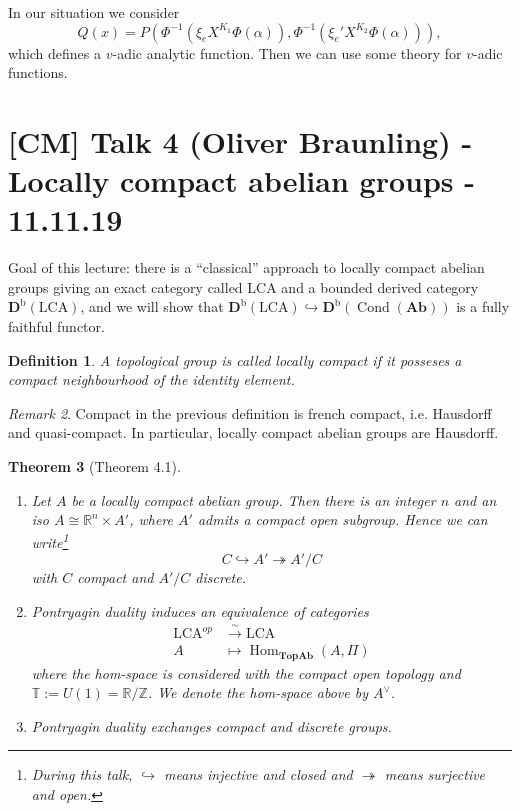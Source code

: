 \documentclass[12pt]{article}
\theoremstyle{darkgreentheorem}
\newtheorem{thm}{Theorem}[section]
\theoremstyle{darkbluedefinition}
\newtheorem{defn}[thm]{Definition}
\theoremstyle{darkredexample}
\theoremstyle{remark}
\newtheorem{rem}[thm]{Remark}
\newcommand{\Z}{\mathbb{Z}}
\newcommand{\R}{\mathbb{R}}
\newcommand{\1}{\mathbbm{1}}
\newcommand{\bbT}{\mathbb{T}}
\newcommand{\Top}{\mathbf{Top}}
\newcommand{\Ab}{\mathbf{Ab}}
\newcommand{\Db}{\mathbf{D}^{\mathrm{b}}}
\DeclareMathOperator{\Hom}{Hom}
\DeclareMathOperator{\Cond}{Cond}
\newcommand{\dual}{^{\vee}}
\newcommand{\tms}{\times}
\newcommand{\epi}{\twoheadrightarrow}
\newcommand{\mono}{\hookrightarrow}
\newcommand{\LCA}{\mathrm{LCA}}
\begin{document}
In our situation we consider
\[ Q(x)=P(\Phi^{-1}(\xi_{e}X^{K_{1}}\Phi(\alpha)),\Phi^{-1}(\xi_{e}'X^{K_{2}}\Phi(\alpha))),\]
which defines a $v$-adic analytic function.
Then we can use some theory for $v$-adic functions.

\section{[CM] Talk 4 (Oliver Braunling) - Locally compact abelian groups - 11.11.19}

Goal of this lecture: there is a ``classical'' approach to locally compact abelian groups giving an exact category called $\LCA$ and a bounded derived category $\Db(\LCA)$, and we will show that $\Db(\LCA)\mono \Db(\Cond(\Ab))$ is a fully faithful functor.

\begin{defn}
    A topological group is called \textit{locally compact} if it posseses a compact neighbourhood of the identity element.
\end{defn}

\begin{rem}
    Compact in the previous definition is french compact, i.e. Hausdorff and quasi-compact.
    In particular, locally compact abelian groups are Hausdorff.
\end{rem}

\begin{thm}[Theorem 4.1]
    \begin{enumerate}[label=\roman*)]
	\item Let $A$ be a locally compact abelian group.
	    Then there is an integer $n$ and an iso $A\cong \R^{n}\tms A'$, where $A'$ admits a compact open subgroup.
	    Hence we can write\footnote{During this talk, $\mono$ means injective and closed and $\epi$ means surjective and open.}
	    \[ C\mono A'\epi A'/C \]
	    with $C$ compact and $A'/C$ discrete.
	\item Pontryagin duality induces an equivalence of categories
	    \begin{align*}
		\LCA^{op}&\xrightarrow{\sim} \LCA \\
		A & \mapsto \Hom_{\Top\Ab}(A,\Pi)
	    \end{align*}
	    where the hom-space is considered with the compact open topology and $\bbT:=U(1)=\R/\Z$.
	    We denote the hom-space above by $A\dual$.
	\item Pontryagin duality exchanges compact and discrete groups.
    \end{enumerate}
\end{thm}
\end{document}
